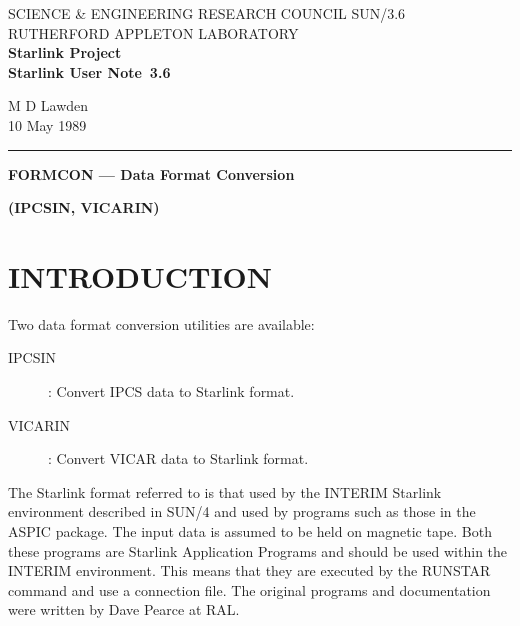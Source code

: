 \pagestyle{myheadings}

\newcommand{\stardoccategory}  {Starlink User Note}
\newcommand{\stardocinitials}  {SUN}
\newcommand{\stardocnumber}    {3.6}
\newcommand{\stardocauthors}   {M D Lawden}
\newcommand{\stardocdate}      {10 May 1989}
\newcommand{\stardoctitle}     {FORMCON --- Data Format Conversion}

\newcommand{\stardocname}{\stardocinitials /\stardocnumber}
\markright{\stardocname}
\setlength{\textwidth}{160mm}
\setlength{\textheight}{240mm}
\setlength{\topmargin}{-5mm}
\setlength{\oddsidemargin}{0mm}
\setlength{\evensidemargin}{0mm}
\setlength{\parindent}{0mm}
\setlength{\parskip}{\medskipamount}
\setlength{\unitlength}{1mm}


\thispagestyle{empty}
SCIENCE \& ENGINEERING RESEARCH COUNCIL \hfill \stardocname\\
RUTHERFORD APPLETON LABORATORY\\
{\large\bf Starlink Project\\}
{\large\bf \stardoccategory\ \stardocnumber}
\begin{flushright}
\stardocauthors\\
\stardocdate
\end{flushright}
\vspace{-4mm}
\rule{\textwidth}{0.5mm}
\vspace{5mm}
\begin{center}
{\Large\bf \stardoctitle}
\end{center}
\begin{center}
{\Large\bf (IPCSIN, VICARIN)}
\end{center}
\vspace{5mm}

\section {INTRODUCTION}

Two data format conversion utilities are available:
\begin{description}
\item[IPCSIN]: Convert IPCS data to Starlink format.
\item[VICARIN]: Convert VICAR data to Starlink format.
\end{description}
The Starlink format referred to is that used by the INTERIM Starlink
environment described in SUN/4 and used by programs such as those in the ASPIC
package.
The input data is assumed to be held on magnetic tape.
Both these programs are Starlink Application Programs and should be used within
the INTERIM environment.
This means that they are executed by the RUNSTAR command and use a connection
file.
The original programs and documentation were written by Dave Pearce at RAL.
